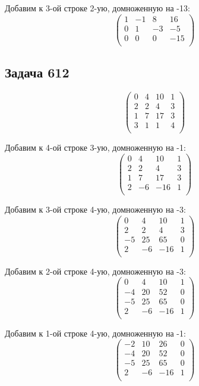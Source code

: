 	Добавим к 3-ой строке 2-ую, домноженную на -13:
	\[
	\begin{pmatrix}
	1 & -1 & 8 & 16 \\
	0 & 1 & -3 & -5 \\
	0 & 0 & 0 & -15 \\
	\end{pmatrix}
	\]
	
	
	\subsection{Задача 612}
	 \[
	 \begin{pmatrix}
	 0 & 4 & 10 & 1 \\
	 2 & 2 & 4 & 3 \\
	 1 & 7 & 17 & 3 \\
	 3 & 1 & 1 & 4 \\
	 \end{pmatrix}
	 \]
	 
	 Добавим к 4-ой строке 3-ую, домноженную на -1:
	 \[
	 \begin{pmatrix}
	 0 & 4 & 10 & 1 \\
	 2 & 2 & 4 & 3 \\
	 1 & 7 & 17 & 3 \\
	 2 & -6 & -16 & 1 \\
	 \end{pmatrix}
	 \]
	 
	 Добавим к 3-ой строке 4-ую, домноженную на -3:
	 \[
	 \begin{pmatrix}
	 0 & 4 & 10 & 1 \\
	 2 & 2 & 4 & 3 \\
	 -5 & 25 & 65 & 0 \\
	 2 & -6 & -16 & 1 \\
	 \end{pmatrix}
	 \]
	 
	 Добавим к 2-ой строке 4-ую, домноженную на -3:
	 \[
	 \begin{pmatrix}
	 0 & 4 & 10 & 1 \\
	 -4 & 20 & 52 & 0 \\
	 -5 & 25 & 65 & 0 \\
	 2 & -6 & -16 & 1 \\
	 \end{pmatrix}
	 \]
	 
	 Добавим к 1-ой строке 4-ую, домноженную на -1:
	 \[
	 \begin{pmatrix}
	 -2 & 10 & 26 & 0 \\
	 -4 & 20 & 52 & 0 \\
	 -5 & 25 & 65 & 0 \\
	 2 & -6 & -16 & 1 \\
	 \end{pmatrix}
	 \]
	 
